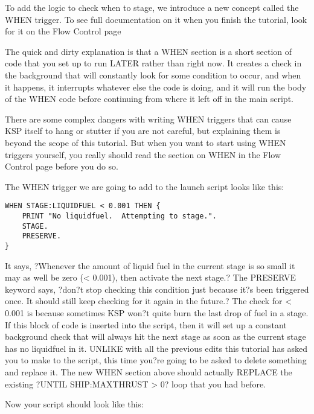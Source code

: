 To add the logic to check when to stage, we introduce a new concept called the WHEN trigger. To see full documentation on it when you finish the tutorial, look for it on the Flow Control page

The quick and dirty explanation is that a WHEN section is a short section of code that you set up to run LATER rather than right now. It creates a check in the background that will constantly look for some condition to occur, and when it happens, it interrupts whatever else the code is doing, and it will run the body of the WHEN code before continuing from where it left off in the main script.

There are some complex dangers with writing WHEN triggers that can cause KSP itself to hang or stutter if you are not careful, but explaining them is beyond the scope of this tutorial. But when you want to start using WHEN triggers yourself, you really should read the section on WHEN in the Flow Control page before you do so.

The WHEN trigger we are going to add to the launch script looks like this:

\begin{Verbatim}[frame=single]
WHEN STAGE:LIQUIDFUEL < 0.001 THEN {
    PRINT "No liquidfuel.  Attempting to stage.".
    STAGE.
    PRESERVE.
}
\end{Verbatim} 

It says, ?Whenever the amount of liquid fuel in the current stage is so small it may as well be zero (< 0.001), then activate the next stage.? The PRESERVE keyword says, ?don?t stop checking this condition just because it?s been triggered once. It should still keep checking for it again in the future.? The check for < 0.001 is because sometimes KSP won?t quite burn the last drop of fuel in a stage. If this block of code is inserted into the script, then it will set up a constant background check that will always hit the next stage as soon as the current stage has no liquidfuel in it. UNLIKE with all the previous edits this tutorial has asked you to make to the script, this time you?re going to be asked to delete something and replace it. The new WHEN section above should actually REPLACE the existing ?UNTIL SHIP:MAXTHRUST > 0? loop that you had before.

Now your script should look like this:

